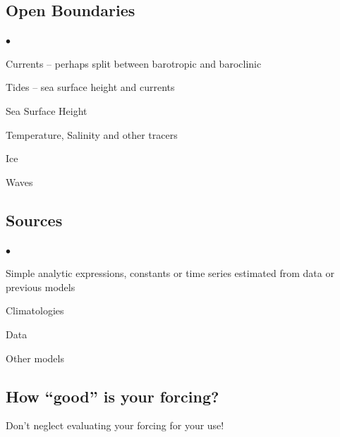 \documentclass[letterpaper,12pt]{article}
\newcounter{lnum}
\newenvironment{abbrevlist}%
  {\begin{list}{$\bullet$}{\setlength{\leftmargin}{2em}%
               \setlength{\itemindent}{0em}%
               \setlength{\itemsep}{0pt}%
               \setlength{\parsep}{0pt}%
               \setlength{\topsep}{2pt}%
               \usecounter{lnum} } }{\end{list}}
\begin{document}
\subsection*{Open Boundaries}

\begin{abbrevlist}
\item Currents -- perhaps split between barotropic and baroclinic
\item Tides -- sea surface height and currents
\item Sea Surface Height
\item Temperature, Salinity and other tracers
\item Ice
\item Waves
\end{abbrevlist}

\subsection*{Sources}

\begin{abbrevlist}
\item Simple analytic expressions, constants or time series estimated from data or previous models
\item Climatologies 
\item Data
\item Other models
\end{abbrevlist}

\subsection*{How ``good'' is your forcing?}

Don't neglect evaluating your forcing for your use!
\end{document}
